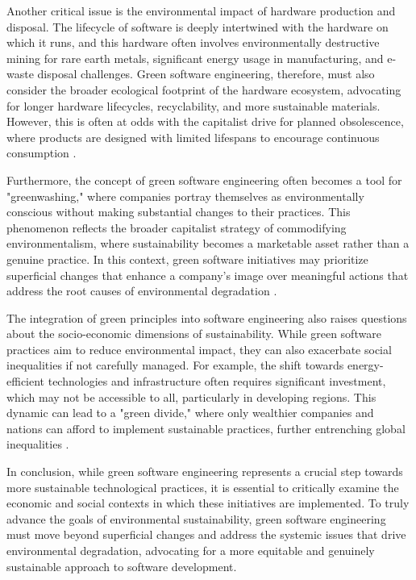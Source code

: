\begin{refsection}
Another critical issue is the environmental impact of hardware production and disposal. The lifecycle of software is deeply intertwined with the hardware on which it runs, and this hardware often involves environmentally destructive mining for rare earth metals, significant energy usage in manufacturing, and e-waste disposal challenges. Green software engineering, therefore, must also consider the broader ecological footprint of the hardware ecosystem, advocating for longer hardware lifecycles, recyclability, and more sustainable materials. However, this is often at odds with the capitalist drive for planned obsolescence, where products are designed with limited lifespans to encourage continuous consumption \cite[pp.~201-204]{patel2007stuff}.

Furthermore, the concept of green software engineering often becomes a tool for "greenwashing," where companies portray themselves as environmentally conscious without making substantial changes to their practices. This phenomenon reflects the broader capitalist strategy of commodifying environmentalism, where sustainability becomes a marketable asset rather than a genuine practice. In this context, green software initiatives may prioritize superficial changes that enhance a company's image over meaningful actions that address the root causes of environmental degradation \cite[pp.~75-78]{monbiot2006heat}.

The integration of green principles into software engineering also raises questions about the socio-economic dimensions of sustainability. While green software practices aim to reduce environmental impact, they can also exacerbate social inequalities if not carefully managed. For example, the shift towards energy-efficient technologies and infrastructure often requires significant investment, which may not be accessible to all, particularly in developing regions. This dynamic can lead to a "green divide," where only wealthier companies and nations can afford to implement sustainable practices, further entrenching global inequalities \cite[pp.~122-125]{smith2010uneven}.

In conclusion, while green software engineering represents a crucial step towards more sustainable technological practices, it is essential to critically examine the economic and social contexts in which these initiatives are implemented. To truly advance the goals of environmental sustainability, green software engineering must move beyond superficial changes and address the systemic issues that drive environmental degradation, advocating for a more equitable and genuinely sustainable approach to software development.


\end{refsection}
